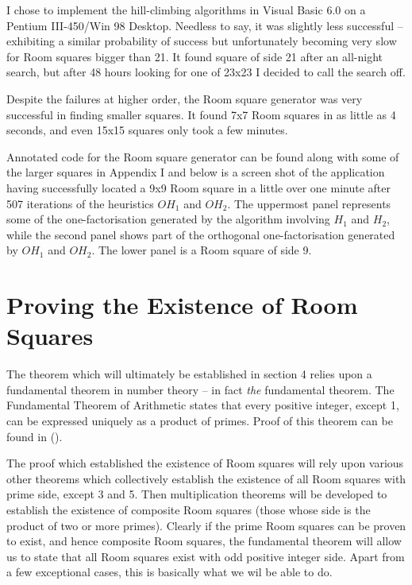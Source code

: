 \documentclass[
  11pt,
  a4paper]{book}
\begin{document}
I chose to implement the hill-climbing algorithms in Visual Basic
6.0 on a Pentium III-450/Win 98 Desktop. Needless to say, it was
slightly less successful -- exhibiting a similar probability of
success but unfortunately becoming very slow for Room squares
bigger than 21. It found square of side 21 after an all-night
search, but after 48 hours looking for one of 23x23 I decided to
call the search off.

Despite the failures at higher order, the Room square generator
was very successful in finding smaller squares. It found 7x7 Room
squares in as little as 4 seconds, and even 15x15 squares only
took a few minutes.

Annotated code for the Room square generator can be found along
with some of the larger squares in Appendix I and below is a
screen shot of the application having successfully located a 9x9
Room square in a little over one minute after 507 iterations of
the heuristics \(OH_1\) and \(OH_2\). The uppermost panel represents
some of the one-factorisation generated by the algorithm involving
\(H_1\) and \(H_2\), while the second panel shows part of the
orthogonal one-factorisation generated by \(OH_1\) and \(OH_2\). The
lower panel is a Room square of side 9.

\hypertarget{proving-the-existence-of-room-squares}{%
\chapter{Proving the Existence of Room Squares}\label{proving-the-existence-of-room-squares}}

The theorem which will ultimately be established in section
4 relies upon a fundamental theorem in number theory -- in
fact \emph{the} fundamental theorem. The Fundamental Theorem of
Arithmetic states that every positive integer, except 1, can
be expressed uniquely as a product of primes. Proof of this
theorem can be found in (\textcite{hardy_introduction_1979}).

The proof which established the existence of Room squares
will rely upon various other theorems which collectively
establish the existence of all Room squares with prime side,
except 3 and 5. Then multiplication theorems will be
developed to establish the existence of composite Room
squares (those whose side is the product of two or more
primes). Clearly if the prime Room squares can be proven to
exist, and hence composite Room squares, the fundamental
theorem will allow us to state that all Room squares exist
with odd positive integer side. Apart from a few exceptional
cases, this is basically what we wil be able to do.
\end{document}

